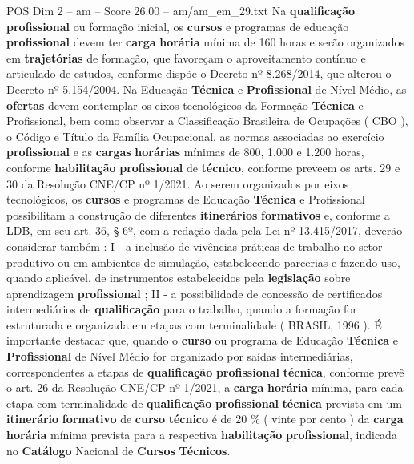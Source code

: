 \begin{textsample}{POS Dim 2 – am – Score 26.00 – am/am\_em\_29.txt}
Na \textbf{qualificação} \textbf{profissional} ou formação inicial, os \textbf{cursos} e programas de educação \textbf{profissional} devem ter \textbf{carga} \textbf{horária} mínima de 160 horas e serão organizados em \textbf{trajetórias} de formação, que favoreçam o aproveitamento contínuo e articulado de estudos, conforme dispõe o Decreto nº 8.268/2014, que alterou o Decreto nº 5.154/2004.
Na Educação \textbf{Técnica} e \textbf{Profissional} de Nível Médio, as \textbf{ofertas} devem contemplar os eixos tecnológicos da Formação \textbf{Técnica} e Profissional, bem como observar a Classificação Brasileira de Ocupações ( CBO ), o Código e Título da Família Ocupacional, as normas associadas ao exercício \textbf{profissional} e as \textbf{cargas} \textbf{horárias} mínimas de 800, 1.000 e 1.200 horas, conforme \textbf{habilitação} \textbf{profissional} de \textbf{técnico}, conforme preveem os arts. 29 e 30 da Resolução CNE/CP nº 1/2021.
Ao serem organizados por eixos tecnológicos, os \textbf{cursos} e programas de Educação \textbf{Técnica} e Profissional possibilitam a construção de diferentes \textbf{itinerários} \textbf{formativos} e, conforme a LDB, em seu art. 36, § 6º, com a redação dada pela Lei nº 13.415/2017, deverão considerar também : I - a inclusão de vivências práticas de trabalho no setor produtivo ou em ambientes de simulação, estabelecendo parcerias e fazendo uso, quando aplicável, de instrumentos estabelecidos pela \textbf{legislação} sobre aprendizagem \textbf{profissional} ; II - a possibilidade de concessão de certificados intermediários de \textbf{qualificação} para o trabalho, quando a formação for estruturada e organizada em etapas com terminalidade ( BRASIL, 1996 ).
É importante destacar que, quando o \textbf{curso} ou programa de Educação \textbf{Técnica} e \textbf{Profissional} de Nível Médio for organizado por saídas intermediárias, correspondentes a etapas de \textbf{qualificação} \textbf{profissional} \textbf{técnica}, conforme prevê o art. 26 da Resolução CNE/CP nº 1/2021, a \textbf{carga} \textbf{horária} mínima, para cada etapa com terminalidade de \textbf{qualificação} \textbf{profissional} \textbf{técnica} prevista em um \textbf{itinerário} \textbf{formativo} de \textbf{curso} \textbf{técnico} é de 20 \% ( vinte por cento ) da \textbf{carga} \textbf{horária} mínima prevista para a respectiva \textbf{habilitação} \textbf{profissional}, indicada no \textbf{Catálogo} Nacional de \textbf{Cursos} \textbf{Técnicos}.

\end{textsample}
